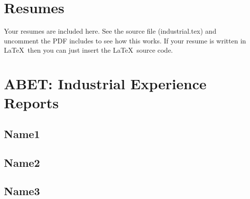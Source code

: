 

\section{Resumes}

Your resumes are included here.  See the source file (industrial.tex) and uncomment the PDF includes to see how this works.  If your resume is written in \LaTeX\ then you can just insert the \LaTeX\ source code.


%     
%     
%     

\section{ABET:  Industrial Experience Reports}

\subsection{Name1}

% 

\subsection{Name2}

% 

\subsection{Name3}

% 


